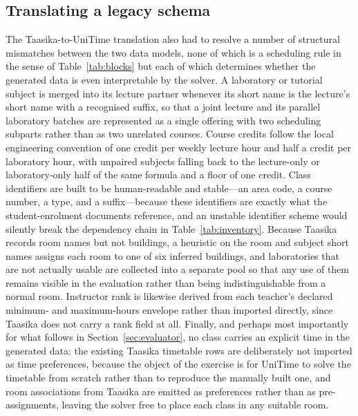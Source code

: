 \documentclass[journal]{IEEEtran}
\begin{document}
\subsection{Translating a legacy schema}
The Taasika-to-UniTime translation also had to resolve a number of structural mismatches between the two data models, none of which is a scheduling rule in the sense of Table~\ref{tab:blocks} but each of which determines whether the generated data is even interpretable by the solver. A laboratory or tutorial subject is merged into its lecture partner whenever its short name is the lecture's short name with a recognised suffix, so that a joint lecture and its parallel laboratory batches are represented as a single offering with two scheduling subparts rather than as two unrelated courses. Course credits follow the local engineering convention of one credit per weekly lecture hour and half a credit per laboratory hour, with unpaired subjects falling back to the lecture-only or laboratory-only half of the same formula and a floor of one credit. Class identifiers are built to be human-readable and stable---an area code, a course number, a type, and a suffix---because these identifiers are exactly what the student-enrolment documents reference, and an unstable identifier scheme would silently break the dependency chain in Table~\ref{tab:inventory}. Because Taasika records room names but not buildings, a heuristic on the room and subject short names assigns each room to one of six inferred buildings, and laboratories that are not actually usable are collected into a separate pool so that any use of them remains visible in the evaluation rather than being indistinguishable from a normal room. Instructor rank is likewise derived from each teacher's declared minimum- and maximum-hours envelope rather than imported directly, since Taasika does not carry a rank field at all. Finally, and perhaps most importantly for what follows in Section~\ref{sec:evaluator}, no class carries an explicit time in the generated data: the existing Taasika timetable rows are deliberately not imported as time preferences, because the object of the exercise is for UniTime to solve the timetable from scratch rather than to reproduce the manually built one, and room associations from Taasika are emitted as preferences rather than as pre-assignments, leaving the solver free to place each class in any suitable room.
\end{document}
